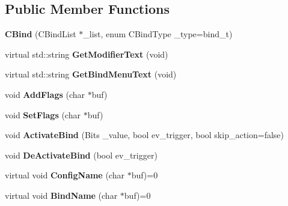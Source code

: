\subsection*{Public Member Functions}
\begin{DoxyCompactItemize}
\item 
\hypertarget{classCBind_a4b69039bdd127345de22a16ef38843e9}{{\bfseries C\-Bind} (C\-Bind\-List $\ast$\-\_\-list, enum C\-Bind\-Type \-\_\-type=bind\-\_\-t)}\label{classCBind_a4b69039bdd127345de22a16ef38843e9}

\item 
\hypertarget{classCBind_ab383a16224dba3e1963700a8be1f951d}{virtual std\-::string {\bfseries Get\-Modifier\-Text} (void)}\label{classCBind_ab383a16224dba3e1963700a8be1f951d}

\item 
\hypertarget{classCBind_aad93548b92bf6b2bb83eee35b7f15d5d}{virtual std\-::string {\bfseries Get\-Bind\-Menu\-Text} (void)}\label{classCBind_aad93548b92bf6b2bb83eee35b7f15d5d}

\item 
\hypertarget{classCBind_aa0773aea4c2324cb3557bf543f8e26de}{void {\bfseries Add\-Flags} (char $\ast$buf)}\label{classCBind_aa0773aea4c2324cb3557bf543f8e26de}

\item 
\hypertarget{classCBind_a1ef5657b830e007e1391e3dd2e24bc4e}{void {\bfseries Set\-Flags} (char $\ast$buf)}\label{classCBind_a1ef5657b830e007e1391e3dd2e24bc4e}

\item 
\hypertarget{classCBind_ac1963875b6c478efc92bfa244937d24e}{void {\bfseries Activate\-Bind} (Bits \-\_\-value, bool ev\-\_\-trigger, bool skip\-\_\-action=false)}\label{classCBind_ac1963875b6c478efc92bfa244937d24e}

\item 
\hypertarget{classCBind_a5fcbf42fb58070fd1a81bf892dc73e1c}{void {\bfseries De\-Activate\-Bind} (bool ev\-\_\-trigger)}\label{classCBind_a5fcbf42fb58070fd1a81bf892dc73e1c}

\item 
\hypertarget{classCBind_a231fb0c4cc20ee05607f1e11b8b1189f}{virtual void {\bfseries Config\-Name} (char $\ast$buf)=0}\label{classCBind_a231fb0c4cc20ee05607f1e11b8b1189f}

\item 
\hypertarget{classCBind_aa9f00238cab696c93603043ca48d456e}{virtual void {\bfseries Bind\-Name} (char $\ast$buf)=0}\label{classCBind_aa9f00238cab696c93603043ca48d456e}

\end{DoxyCompactItemize}
